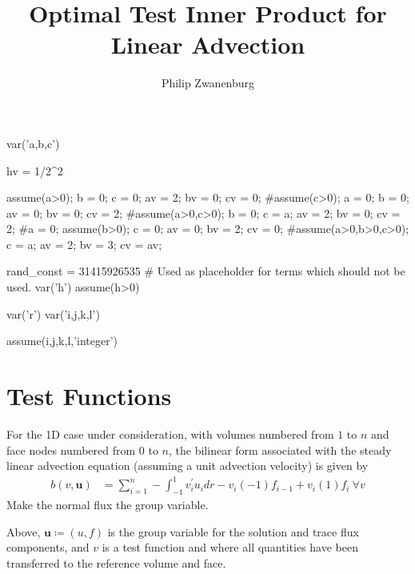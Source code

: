 \documentclass{article}
\title{Optimal Test Inner Product for Linear Advection}
\author{Philip Zwanenburg}
\numberwithin{equation}{section}
\newcommand{\makered}[1]{{\color{red}#1}}
\newcommand{\varg}[1]{\mathit{\bm{{#1}}}} %
\newcommand{\jump}[1]{{\llbracket #1\rrbracket}}
\begin{document}
\maketitle


\begin{sagesilent}
var('a,b,c')

hv = 1/2^2

assume(a>0); b = 0; c = 0; av = 2; bv = 0; cv = 0;
#assume(c>0); a = 0; b = 0; av = 0; bv = 0; cv = 2;
#assume(a>0,c>0); b = 0; c = a; av = 2; bv = 0; cv = 2;
#a = 0; assume(b>0); c = 0; av = 0; bv = 2; cv = 0;
#assume(a>0,b>0,c>0); c = a; av = 2; bv = 3; cv = av;
\end{sagesilent}


\begin{sagesilent}
rand_const = 31415926535 # Used as placeholder for terms which should not be used.
var('h')
assume(h>0)

var('r')
var('i,j,k,l')

assume(i,j,k,l,'integer')
\end{sagesilent}

\section{Test Functions}

For the 1D case under consideration, with volumes numbered from $1$ to $n$ and face nodes numbered from $0$ to $n$, the
bilinear form associated with the steady linear advection equation (assuming a unit advection velocity) is given by
\begin{align} \label{eq:bilinear_adv}
b(v,\varg{u}) 
& = \sum_{i=1}^n -\int_{-1}^{1} v_i^{'} u_i dr - v_i(-1)f_{i-1}+v_{i}(1)f_i\ \forall v
\end{align}
\makered{Make the normal flux the group variable.}

Above, $\varg{u} \coloneqq (u,f)$ is the group variable for the solution and trace flux components, and $v$ is a test
function and where all quantities have been transferred to the reference volume and face.
\\~
\end{document}
